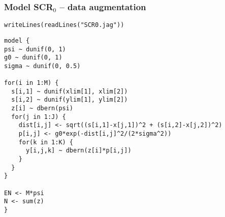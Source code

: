 \documentclass[color=usenames,dvipsnames]{beamer}\usepackage[]{graphicx}\usepackage[]{color}
\makeatletter
\newcommand{\hlstr}[1]{\textcolor[rgb]{0.749,0.012,0.012}{#1}}%
\newcommand{\hlstd}[1]{\textcolor[rgb]{0,0,0}{#1}}%
\newcommand{\hlkwd}[1]{\textcolor[rgb]{0.004,0.004,0.506}{#1}}%
\newenvironment{kframe}{%
 \def\at@end@of@kframe{}%
 \ifinner\ifhmode%
  \def\at@end@of@kframe{\end{minipage}}%
  \begin{minipage}{\columnwidth}%
 \fi\fi%
 \def\FrameCommand##1{\hskip\@totalleftmargin \hskip-\fboxsep
 \colorbox{shadecolor}{##1}\hskip-\fboxsep
     \hskip-\linewidth \hskip-\@totalleftmargin \hskip\columnwidth}%
 \MakeFramed {\advance\hsize-\width
   \@totalleftmargin\z@ \linewidth\hsize
   \@setminipage}}%
 {\par\unskip\endMakeFramed%
 \at@end@of@kframe}
\newenvironment{knitrout}{}{} %
\makeatother
\begin{document}
\begin{frame}[fragile]
  \frametitle{Model SCR$_0$ -- data augmentation}
\vspace{-3pt}
\begin{knitrout}\scriptsize
{}\color{fgcolor}\begin{kframe}
\begin{alltt}
\hlkwd{writeLines}\hlstd{(}\hlkwd{readLines}\hlstd{(}\hlstr{"SCR0.jag"}\hlstd{))}
\end{alltt}
\begin{verbatim}
model {
psi ~ dunif(0, 1)
g0 ~ dunif(0, 1)
sigma ~ dunif(0, 0.5)

for(i in 1:M) {
  s[i,1] ~ dunif(xlim[1], xlim[2])
  s[i,2] ~ dunif(ylim[1], ylim[2])
  z[i] ~ dbern(psi)
  for(j in 1:J) {
    dist[i,j] <- sqrt((s[i,1]-x[j,1])^2 + (s[i,2]-x[j,2])^2)
    p[i,j] <- g0*exp(-dist[i,j]^2/(2*sigma^2))
    for(k in 1:K) {
      y[i,j,k] ~ dbern(z[i]*p[i,j])
    }
  }
}

EN <- M*psi
N <- sum(z)
}
\end{verbatim}
\end{kframe}
\end{knitrout}
\end{frame}
\end{document}
